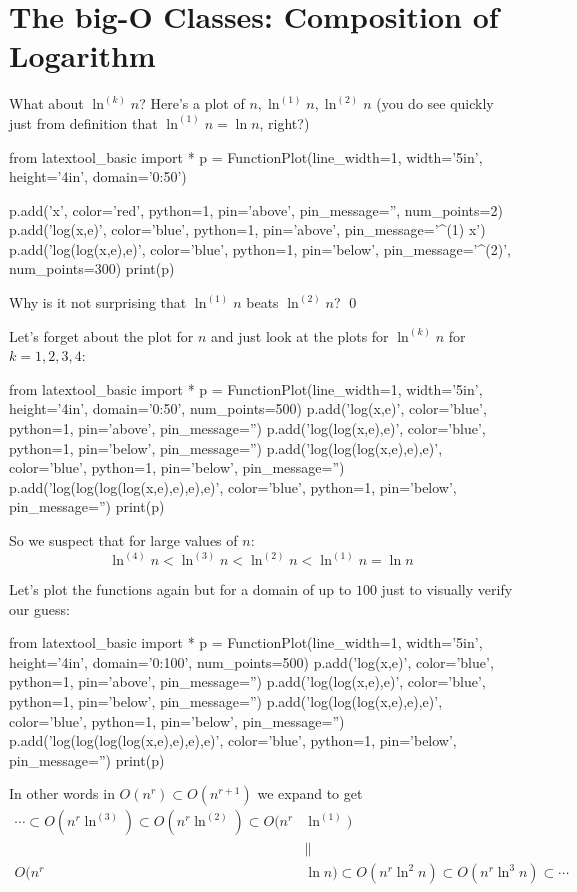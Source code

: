 \section{The big-O Classes: Composition of Logarithm}

What about $\ln^{(k)} n$?
Here's a plot of $n, \ln^{(1)} n, \ln^{(2)} n$ 
(you do see quickly just from definition that $\ln^{(1)} n = \ln n$, right?)

\begin{python}
from latextool_basic import *
p = FunctionPlot(line_width=1, width='5in', height='4in', domain='0:50')

p.add('x', color='red', python=1, pin='above', pin_message='', num_points=2)
p.add('log(x,e)', color='blue', python=1, pin='above', pin_message='\ln^{(1)} x')
p.add('log(log(x,e),e)', color='blue', python=1, pin='below', pin_message='\ln^{(2)}', num_points=300)
print(p)
\end{python}

\begin{ex}
Why is it not surprising that $\ln^{(1)} n$ beats $\ln^{(2)} n$?
\qed
\end{ex}

Let's forget about the plot for $n$ and just look at the plots for
$\ln^{(k)} n$ for $k=1, 2, 3, 4$:

\begin{python}
from latextool_basic import *
p = FunctionPlot(line_width=1, width='5in', height='4in', domain='0:50',
                 num_points=500)
p.add('log(x,e)', color='blue', python=1, pin='above', pin_message='')
p.add('log(log(x,e),e)', color='blue', python=1, pin='below', pin_message='')
p.add('log(log(log(x,e),e),e)', color='blue', python=1, pin='below', pin_message='')
p.add('log(log(log(log(x,e),e),e),e)', color='blue', python=1, pin='below', pin_message='')
print(p)
\end{python}

So we suspect that for large values of $n$:
\[
\ln^{(4)} n < 
\ln^{(3)} n < 
\ln^{(2)} n < 
\ln^{(1)} n = \ln n 
\]

Let's plot the functions again but for a domain of up to $100$ just
to visually verify our guess:
\begin{python}
from latextool_basic import *
p = FunctionPlot(line_width=1, width='5in', height='4in', domain='0:100',
                 num_points=500)
p.add('log(x,e)', color='blue', python=1, pin='above', pin_message='')
p.add('log(log(x,e),e)', color='blue', python=1, pin='below', pin_message='')
p.add('log(log(log(x,e),e),e)', color='blue', python=1, pin='below', pin_message='')
p.add('log(log(log(log(x,e),e),e),e)', color='blue', python=1, pin='below', pin_message='')
print(p)
\end{python}

In other words in $O(n^r) \subset O(n^{r+1})$ we expand 
to get
\begin{align*}
\cdots
\subset O(n^r \ln^{(3)})
\subset O(n^r \ln^{(2)})
\subset O(n^r &\ln^{(1)}) \\ 
&\| \\
O(n^r &\ln n) 
\subset  O(n^r\ln^2 n) 
\subset  O(n^r\ln^3 n)
\subset \cdots 
\end{align*}
